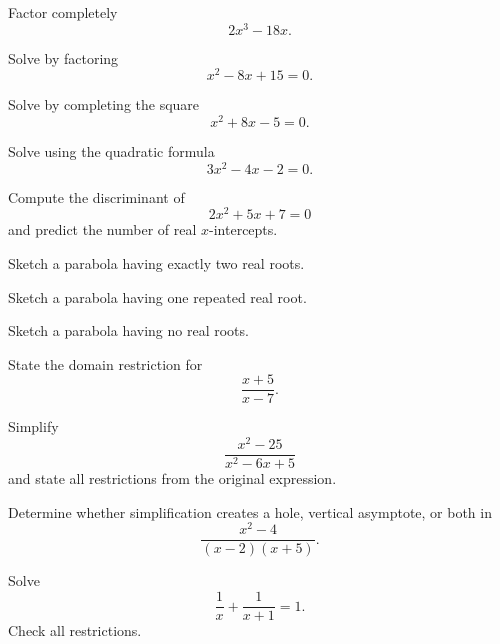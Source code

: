 \begin{exercise}[2]
Factor completely
\[ 2x^3-18x. \]
\end{exercise}

\begin{exercise}[1]
Solve by factoring
\[ x^2-8x+15=0. \]
\end{exercise}

\begin{exercise}[2]
Solve by completing the square
\[ x^2+8x-5=0. \]
\end{exercise}

\begin{exercise}[2]
Solve using the quadratic formula
\[ 3x^2-4x-2=0. \]
\end{exercise}

\begin{exercise}[2]
Compute the discriminant of
\[ 2x^2+5x+7=0 \]
and predict the number of real \(x\)-intercepts.
\end{exercise}

\begin{exercise}[2]
Sketch a parabola having exactly two real roots.
\end{exercise}

\begin{exercise}[2]
Sketch a parabola having one repeated real root.
\end{exercise}

\begin{exercise}[2]
Sketch a parabola having no real roots.
\end{exercise}

\begin{exercise}[1]
State the domain restriction for
\[ \frac{x+5}{x-7}. \]
\end{exercise}

\begin{exercise}[2]
Simplify
\[ \frac{x^2-25}{x^2-6x+5} \]
and state all restrictions from the original expression.
\end{exercise}

\begin{exercise}[2]
Determine whether simplification creates a hole, vertical asymptote, or both in
\[ \frac{x^2-4}{(x-2)(x+5)}. \]
\end{exercise}

\begin{exercise}[2]
Solve
\[ \frac1x+\frac1{x+1}=1. \]
Check all restrictions.
\end{exercise}

